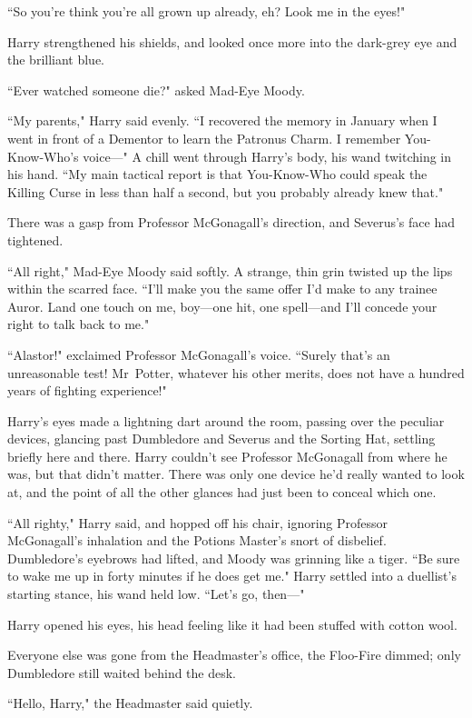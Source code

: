 ``So you're think you're all grown up already, eh? Look me in the eyes!"

Harry strengthened his shields, and looked once more into the dark-grey eye and the brilliant blue.

``Ever watched someone die?" asked Mad-Eye Moody.

``My parents," Harry said evenly. ``I recovered the memory in January when I went in front of a Dementor to learn the Patronus Charm. I remember You-Know-Who's voice—" A chill went through Harry's body, his wand twitching in his hand. ``My main tactical report is that You-Know-Who could speak the Killing Curse in less than half a second, but you probably already knew that."

There was a gasp from Professor McGonagall's direction, and Severus's face had tightened.

``All right," Mad-Eye Moody said softly. A strange, thin grin twisted up the lips within the scarred face. ``I'll make you the same offer I'd make to any trainee Auror. Land one touch on me, boy—one hit, one spell—and I'll concede your right to talk back to me."

``Alastor!" exclaimed Professor McGonagall's voice. ``Surely that's an unreasonable test! Mr~Potter, whatever his other merits, does not have a hundred years of fighting experience!"

Harry's eyes made a lightning dart around the room, passing over the peculiar devices, glancing past Dumbledore and Severus and the Sorting Hat, settling briefly here and there. Harry couldn't see Professor McGonagall from where he was, but that didn't matter. There was only one device he'd really wanted to look at, and the point of all the other glances had just been to conceal which one.

``All righty," Harry said, and hopped off his chair, ignoring Professor McGonagall's inhalation and the Potions Master's snort of disbelief. Dumbledore's eyebrows had lifted, and Moody was grinning like a tiger. ``Be sure to wake me up in forty minutes if he does get me." Harry settled into a duellist's starting stance, his wand held low. ``Let's go, then—"

\later

Harry opened his eyes, his head feeling like it had been stuffed with cotton wool.

Everyone else was gone from the Headmaster's office, the Floo-Fire dimmed; only Dumbledore still waited behind the desk.

``Hello, Harry," the Headmaster said quietly.

